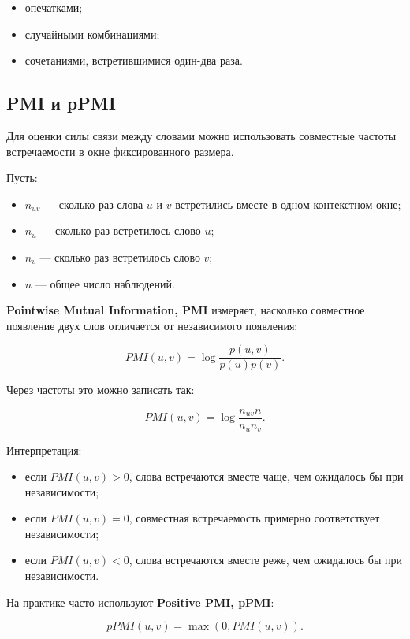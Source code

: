 \documentclass[a4paper,12pt]{article}
\begin{document}
\begin{itemize}
    \item опечатками;
    \item случайными комбинациями;
    \item сочетаниями, встретившимися один-два раза.
\end{itemize}

\subsection{PMI и pPMI}

Для оценки силы связи между словами можно использовать совместные частоты встречаемости в окне фиксированного размера.

Пусть:

\begin{itemize}
    \item \(n_{uv}\) --- сколько раз слова \(u\) и \(v\) встретились вместе в одном контекстном окне;
    \item \(n_u\) --- сколько раз встретилось слово \(u\);
    \item \(n_v\) --- сколько раз встретилось слово \(v\);
    \item \(n\) --- общее число наблюдений.
\end{itemize}

\textbf{Pointwise Mutual Information, PMI} измеряет, насколько совместное появление двух слов отличается от независимого появления:

\[
PMI(u,v)
=
\log \frac{p(u,v)}{p(u)p(v)}.
\]

Через частоты это можно записать так:

\[
PMI(u,v)
=
\log \frac{n_{uv} n}{n_u n_v}.
\]

Интерпретация:

\begin{itemize}
    \item если \(PMI(u,v) > 0\), слова встречаются вместе чаще, чем ожидалось бы при независимости;
    \item если \(PMI(u,v) = 0\), совместная встречаемость примерно соответствует независимости;
    \item если \(PMI(u,v) < 0\), слова встречаются вместе реже, чем ожидалось бы при независимости.
\end{itemize}

На практике часто используют \textbf{Positive PMI, pPMI}:

\[
pPMI(u,v) = \max(0, PMI(u,v)).
\]
\end{document}
